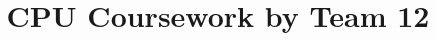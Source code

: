 \documentclass[a4paper, 11pt]{article}      %
\title{\LARGE \bf
CPU Coursework by Team 12
}
\begin{document}
\sloppy



\tableofcontents




%

%

\end{document}
